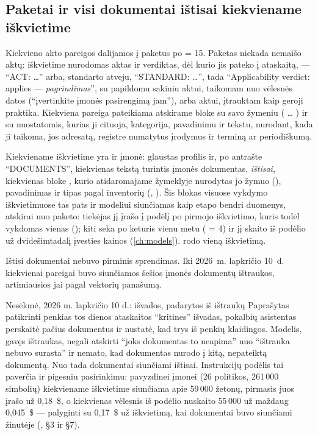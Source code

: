 \subsection{Paketai ir visi dokumentai ištisai kiekviename iškvietime}

Kiekvieno akto pareigos dalijamos į paketus po  = 15. Paketas niekada
nemaišo aktų: iškvietime nurodomas aktas ir verdiktas, dėl kurio jis pateko į ataskaitą, ---
\enquote{ACT: \ldots} arba, standarto atveju, \enquote{STANDARD: \ldots}, tada
\enquote{Applicability verdict: applies --- \emph{pagrindimas}}, su papildomu sakiniu aktui,
taikomam nuo vėlesnės datos (\enquote{įvertinkite įmonės pasirengimą jam}), arba aktui,
įtrauktam kaip geroji praktika. Kiekviena pareiga pateikiama atskirame bloke su savo žymeniu
( \ldots{} ) ir su nuostatomis, kurias ji cituoja, kategorija, pavadinimu ir
tekstu, nurodant, kada ji taikoma, jos adresatą, registre numatytus įrodymus ir terminą ar
periodiškumą.

Kiekviename iškvietime yra ir įmonė: glaustas profilis ir, po antrašte \enquote{DOCUMENTS},
kiekvienas tekstą turintis įmonės dokumentas, \emph{ištisai}, kiekvienas bloke
, kurio atidaromajame žymeklyje nurodytas jo žymuo (), pavadinimas ir
tipas pagal inventorių (, ). Šis blokas visuose
vykdymo iškvietimuose tas pats ir modeliui siunčiamas kaip etapo bendri duomenys, atskirai nuo
paketo: tiekėjas jį įrašo į podėlį po pirmojo iškvietimo, kuris todėl vykdomas vienas
(); kiti seka po keturis vienu metu ( = 4) ir jį skaito iš
podėlio už dvidešimtadalį įvesties kainos (\cref{ch:models}).  rodo
vieną iškvietimą.

Ištisi dokumentai nebuvo pirminis sprendimas. Iki 2026~m. lapkričio 10~d. kiekvienai pareigai
buvo siunčiamos šešios įmonės dokumentų ištraukos, artimiausios jai pagal vektorių panašumą.

\begin{lessonbox}{Nesėkmė, 2026 m. lapkričio 10 d.: išvados, padarytos iš ištraukų}
Paprašytas patikrinti penkias tos dienos ataskaitos \enquote{kritines} išvadas, pokalbių
asistentas perskaitė pačius dokumentus ir nustatė, kad trys iš penkių klaidingos. Modelis,
gavęs ištraukas, negali atskirti \enquote{joks dokumentas to neapima} nuo \enquote{ištrauka
nebuvo surasta} ir nemato, kad dokumentas nurodo į kitą, nepateiktą dokumentą. Nuo tada
dokumentai siunčiami ištisai. Instrukcijų podėlis tai paverčia ir pigesniu pasirinkimu:
pavyzdinei įmonei (26 politikos, 261\,000 simbolių) kiekviename iškvietime siunčiama apie 59\,000
žetonų, pirmasis juos įrašo už 0,18~\$, o kiekvienas vėlesnis iš podėlio nuskaito 55\,000 už
maždaug 0,045~\$ --- palyginti su 0,17~\$ už iškvietimą, kai dokumentai buvo siunčiami žinutėje
(, §3 ir §7).
\end{lessonbox}

